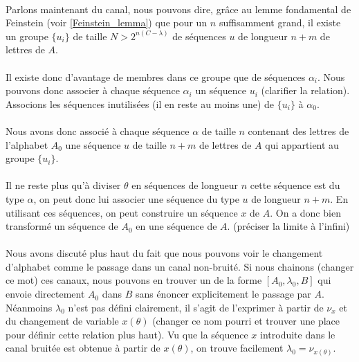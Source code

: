	\paragraph{}
	Parlons maintenant du canal, nous pouvons dire, grâce au lemme fondamental de Feinstein (voir \ref{Feinstein_lemma}) 
	que pour un $n$ suffisamment grand, il existe un groupe $\{u_i\}$ de taille $N > 2^{n(C-\lambda)}$ de séquences $u$ de longueur $n+m$ de lettres 
	de $A$.
	
	\paragraph{}
	Il existe donc d'avantage de membres dans ce groupe que de séquences $\alpha_i$. Nous pouvons donc associer à chaque séquence $\alpha_i$
	un séquence $u_i$ (clarifier la relation). Associons les séquences inutilisées (il en reste au moins une) de $\{u_i\}$ à $\alpha_0$.
	
	\paragraph{}
	Nous avons donc associé à chaque séquence $\alpha$ de taille $n$ contenant des lettres de l'alphabet $A_0$ une séquence $u$ de taille $n+m$ de
	lettres de $A$ qui appartient au groupe $\{u_i\}$. 
	
	\paragraph{}
	Il ne reste plus qu'à diviser $\theta$ en séquences de longueur $n$ cette séquence est du type $\alpha$, on peut donc lui 
	associer une séquence du type $u$ de longueur $n+m$. En utilisant ces séquences, on peut construire un séquence $x$ de $A$. On a donc bien transformé
	un séquence de $A_0$ en une séquence de $A$. (préciser la limite à l'infini)
	
	\paragraph{}Nous avons discuté plus haut du fait que nous pouvons voir le changement d'alphabet comme le passage dans un canal non-bruité. 
	Si nous chainons (changer ce mot) ces canaux, nous pouvons en trouver un de la forme $[A_0,\lambda_0,B]$ qui envoie directement $A_0$ dans $B$ 
	sans énoncer explicitement le passage par $A$. Néanmoins $\lambda_0$ n'est pas défini clairement, il s'agit de l'exprimer à partir de $\nu_x$ et
	du changement de variable $x(\theta)$ (changer ce nom pourri et trouver une place pour définir cette relation plus haut). 
	Vu que la séquence $x$ introduite dans le canal bruitée est obtenue à partir de $x(\theta)$, on trouve facilement $\lambda_0=\nu_{x(\theta)}$.
	
